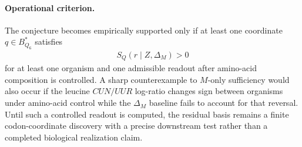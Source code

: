 \paragraph{Operational criterion.}
The conjecture becomes empirically supported only if at least one coordinate $q\in B^*_{Q_6}$ satisfies
$$
\begin{aligned}
S_Q(r\mid Z,\Delta_M)>0
\end{aligned}
$$
for at least one organism and one admissible readout after amino-acid composition is controlled.  A sharp counterexample to $M$-only sufficiency would also occur if the leucine $CUN/UUR$ log-ratio changes sign between organisms under amino-acid control while the $\Delta_M$ baseline fails to account for that reversal.  Until such a controlled readout is computed, the residual basis remains a finite codon-coordinate discovery with a precise downstream test rather than a completed biological realization claim.

